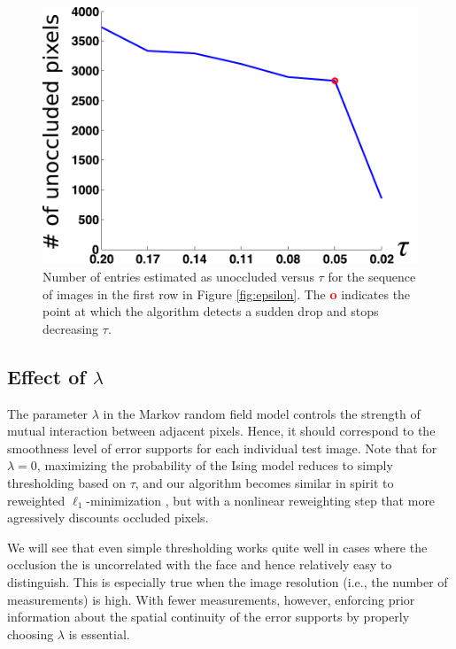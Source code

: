 \begin{figure}
\centering
\includegraphics[scale=0.6,clip=true]{figures_iccv/n_of_goodentry.pdf}\vspace{2mm}
\caption{Number of entries estimated as unoccluded versus
$\tau$ for the sequence of images in the first row in Figure \ref{fig:epsilon}. The {\bf \textcolor{red} o} indicates the
point at which the algorithm detects a sudden drop and stops
decreasing $\tau$.} \label{fig:n_goodentry} \vspace{0mm}
\end{figure}

\subsection{Effect of $\lambda$}

The parameter $\lambda$ in the Markov random field model controls
the strength of mutual interaction between adjacent pixels. Hence, it
should correspond to the smoothness level of error supports for
each individual test image. Note that for $\lambda=0$, maximizing
the probability of the Ising model reduces to simply thresholding
based on $\tau$, and our algorithm becomes similar in spirit to
reweighted $\ell_1$-minimization \cite{Candes2008-JFAA}, but
with a nonlinear reweighting step that more agressively discounts occluded pixels.

We will see that even simple thresholding works
quite well in cases where the occlusion the is uncorrelated with the face and
hence relatively easy to distinguish. This is especially true when the
image resolution (i.e., the number of measurements) is high.
With fewer measurements, however, enforcing prior
information about the spatial continuity of the error supports by
properly choosing $\lambda$ is essential.\vspace{0mm}


